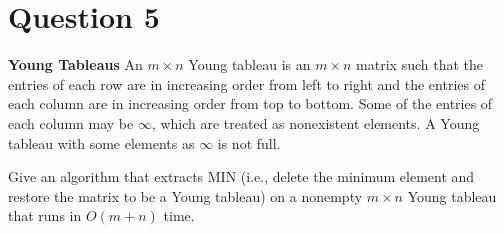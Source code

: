 \documentclass[11pt]{article}
\begin{document}
\section{Question 5} \textbf{Young Tableaus} An $m \times n$ Young tableau is an $m\times n$ matrix such that the entries of each row are in increasing order from left to right and the entries of each column are in increasing order from top to bottom. Some of the entries of each column may be $\infty$, which are treated as nonexistent elements. A Young tableau with some elements as $\infty$ is not full. 

Give an algorithm that extracts MIN (i.e., delete the minimum element and restore the matrix to be a Young tableau) on a nonempty $m\times n$ Young tableau that runs in $O(m+n)$ time. 
\end{document}
